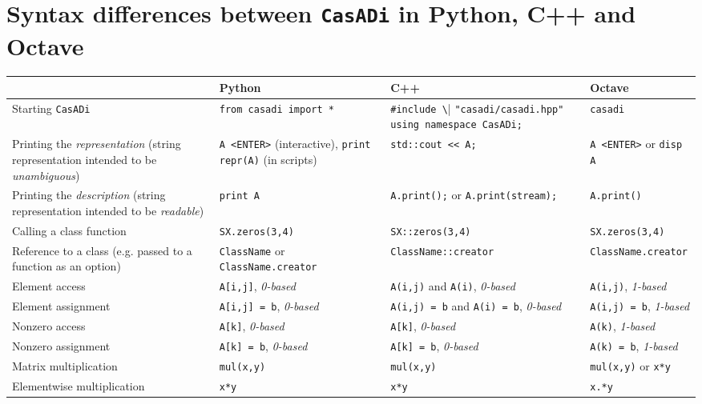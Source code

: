 \documentclass[a4paper,12pt]{book}
\newcommand{\CasADi}{\texttt{CasADi}\xspace}
\begin{document}
\chapter{Syntax differences between \CasADi in Python, C++ and Octave} \label{ch:syntax_differences}
\scriptsize
\begin{center}
  \begin{tabular}{| p{3.5cm} | p{3.5cm} | p{3.5cm} | p{3.5cm} | }
    \hline
      & Python & C++ & Octave \\ \hline
    Starting \CasADi & \verb|from casadi import *| & \verb|#include \| \verb|"casadi/casadi.hpp"| \verb|using namespace CasADi;| & \verb|casadi| \\ \hline
    Printing the \emph{representation} (string representation intended to be \emph{unambiguous}) & \verb|A <ENTER>| (interactive), \verb|print repr(A)| (in scripts) & \verb|std::cout << A;|& \verb|A <ENTER>| or \verb|disp A|\\ \hline
    Printing the \emph{description} (string representation intended to be \emph{readable}) & \verb|print A| & \verb|A.print();| or \verb|A.print(stream);|& \verb|A.print()| \\ \hline
    Calling a class function & \verb|SX.zeros(3,4)| & \verb|SX::zeros(3,4)| & \verb|SX.zeros(3,4)|\\ \hline
    Reference to a class (e.g. passed to a function as an option) & \verb|ClassName| or \verb|ClassName.creator| & \verb|ClassName::creator| & \verb|ClassName.creator|\\ \hline
    Element access & \verb|A[i,j]|, \emph{0-based} & \verb|A(i,j)| and \verb|A(i)|, \emph{0-based} & \verb|A(i,j)|, \emph{1-based} \\ \hline
    Element assignment & \verb|A[i,j] = b|, \emph{0-based} & \verb|A(i,j) = b| and \verb|A(i) = b|, \linebreak \emph{0-based} & \verb|A(i,j) = b|, \emph{1-based} \\ \hline
    Nonzero access & \verb|A[k]|, \emph{0-based} & \verb|A[k]|, \emph{0-based} & \verb|A(k)|, \emph{1-based} \\ \hline
    Nonzero assignment & \verb|A[k] = b|, \emph{0-based} & \verb|A[k] = b|, \emph{0-based} & \verb|A(k) = b|, \emph{1-based} \\ \hline
    Matrix multiplication & \verb|mul(x,y)| & \verb|mul(x,y)| & \verb|mul(x,y)| or \verb|x*y| \\ \hline
    Elementwise multiplication & \verb|x*y| & \verb|x*y| & \verb|x.*y| \\ \hline

\end{tabular}
\end{center}
\end{document}
